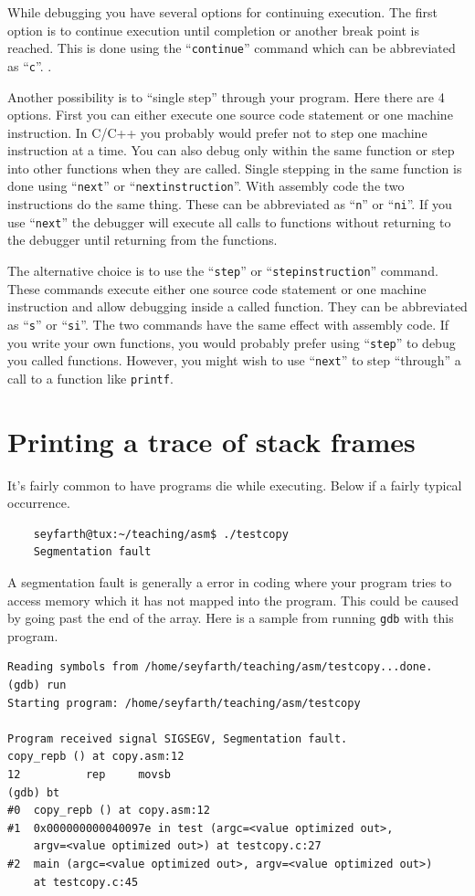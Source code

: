 \documentclass[11pt,b5paper]{book}
\begin{document}
While debugging you have several options for continuing execution.
The first option is to continue execution until completion or another break point is reached.
This is done using the ``{\tt continue}'' command which can be abbreviated as ``{\tt c}''.   .

Another possibility is to ``single step'' through your program.  
Here there are 4 options.
First you can either execute one source code statement or one machine instruction.
In C/C++ you probably would prefer not to step one machine instruction at a time.
You can also debug only within the same function or step into other functions when they are called.
Single stepping in the same function is done using ``{\tt next}'' or ``{\tt nextinstruction}''.  
With assembly code the two instructions do the same thing.
These can be abbreviated as ``{\tt n}'' or ``{\tt ni}''.
If you use ``{\tt next}'' the debugger will execute all calls to functions without returning to the
debugger until returning from the functions.

The alternative choice is to use the ``{\tt step}'' or ``{\tt stepinstruction}'' command.
These commands execute either one source code statement or one machine instruction and allow debugging
inside a called function.
They can be abbreviated as ``{\tt s}'' or  ``{\tt si}''.
The two commands have the same effect with assembly code.
If you write your own functions, you would probably prefer using ``{\tt step}'' to debug you called functions.
However, you might wish to use ``{\tt next}'' to step ``through'' a call to a function like {\tt printf}.


\section{Printing a trace of stack frames}

It's fairly common to have programs die while executing.
Below if a fairly typical occurrence.
\begin{verbatim}
    seyfarth@tux:~/teaching/asm$ ./testcopy 
    Segmentation fault
\end{verbatim}
A segmentation fault is generally a error in coding where your program tries to access memory which it
has not mapped into the program.
This could be caused by going past the end of the array.
Here is a sample from running {\tt gdb} with this program.

\begin{verbatim}
Reading symbols from /home/seyfarth/teaching/asm/testcopy...done.
(gdb) run
Starting program: /home/seyfarth/teaching/asm/testcopy 

Program received signal SIGSEGV, Segmentation fault.
copy_repb () at copy.asm:12
12          rep     movsb
(gdb) bt
#0  copy_repb () at copy.asm:12
#1  0x000000000040097e in test (argc=<value optimized out>, 
    argv=<value optimized out>) at testcopy.c:27
#2  main (argc=<value optimized out>, argv=<value optimized out>)
    at testcopy.c:45
\end{verbatim}
\end{document}
